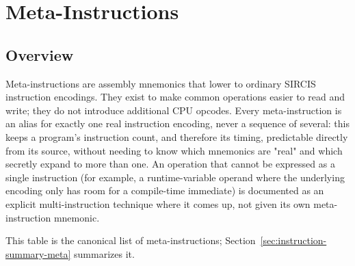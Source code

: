 \chapter{Meta-Instructions}
\label{ch:meta-instructions}

\section{Overview}

Meta-instructions are assembly mnemonics that lower to ordinary SIRCIS instruction encodings. They exist to make common
operations easier to read and write; they do not introduce additional CPU opcodes. Every meta-instruction is an alias
for exactly one real instruction encoding, never a sequence of several: this keeps a program's instruction count, and
therefore its timing, predictable directly from its source, without needing to know which mnemonics are "real" and
which secretly expand to more than one. An operation that cannot be expressed as a single instruction (for example, a
runtime-variable operand where the underlying encoding only has room for a compile-time immediate) is documented as an
explicit multi-instruction technique where it comes up, not given its own meta-instruction mnemonic.

This table is the canonical list of meta-instructions; Section~\ref{sec:instruction-summary-meta} summarizes it.

